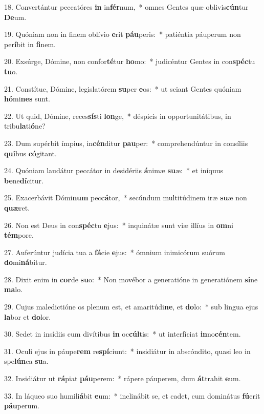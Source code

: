 18. Convertántur peccatóres \textbf{in} in\textbf{fér}num,~*  omnes Gentes quæ oblivis\textbf{cún}tur \textbf{De}um.\

19. Quóniam non in finem oblívio \textbf{e}rit \textbf{páu}peris:~*  patiéntia páuperum non per\textbf{í}bit in \textbf{fi}nem.\

20. Exsúrge, Dómine, non confor\textbf{té}tur \textbf{ho}mo:~*  judicéntur Gentes in con\textbf{spéc}tu \textbf{tu}o.\

21. Constítue, Dómine, legislatórem \textbf{su}per \textbf{e}os:~*  ut sciant Gentes quóniam \textbf{hó}mi\textbf{nes} sunt.\

22. Ut quid, Dómine, reces\textbf{sís}ti \textbf{lon}ge,~*  déspicis in opportunitátibus, in tribu\textbf{la}ti\textbf{ó}ne?\

23. Dum supérbit ímpius, in\textbf{cén}ditur \textbf{pau}per:~*  comprehendúntur in consíliis \textbf{qui}bus \textbf{có}gitant.\

24. Quóniam laudátur peccátor in desidériis \textbf{á}nimæ \textbf{su}æ:~*  et iníquus \textbf{be}ne\textbf{dí}citur.\

25. Exacerbávit Dómi\textbf{num} pec\textbf{cá}tor,~*  secúndum multitúdinem iræ \textbf{su}æ non \textbf{quæ}ret.\

26. Non est Deus in con\textbf{spéc}tu \textbf{e}jus:~*  inquinátæ sunt viæ illíus in \textbf{om}ni \textbf{tém}pore.\

27. Auferúntur judícia tua a \textbf{fá}cie \textbf{e}jus:~*  ómnium inimicórum suórum \textbf{do}mi\textbf{ná}bitur.\

28. Dixit enim in \textbf{cor}de \textbf{su}o:~*  Non movébor a generatióne in generatiónem \textbf{si}ne \textbf{ma}lo.\

29. Cujus maledictióne os plenum est, et amaritúdi\textbf{ne}, et \textbf{do}lo:~*  sub lingua ejus \textbf{la}bor et \textbf{do}lor.\

30. Sedet in insídiis cum divítibus \textbf{in} oc\textbf{cúl}tis:~*  ut interfíciat \textbf{in}no\textbf{cén}tem.\

31. Oculi ejus in páupe\textbf{rem} re\textbf{spí}ciunt:~*  insidiátur in abscóndito, quasi leo in spe\textbf{lún}ca \textbf{su}a.\

32. Insidiátur ut \textbf{rá}piat \textbf{páu}perem:~*  rápere páuperem, dum \textbf{át}trahit \textbf{e}um.\

33. In láqueo suo humili\textbf{á}bit \textbf{e}um:~*  inclinábit se, et cadet, cum dominátus \textbf{fú}erit \textbf{páu}perum.\

